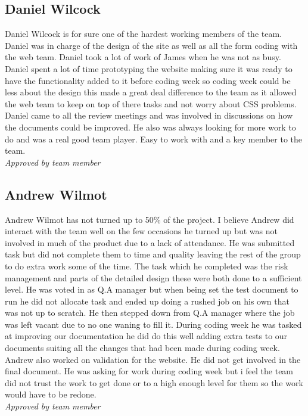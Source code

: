 \subsection{Daniel Wilcock}
    Daniel Wilcock is for sure one of the hardest working members of the team. Daniel was in charge of the design of the site as well as all the form coding with the web team. Daniel took a lot of work of James when he was not as busy. Daniel spent a lot of time prototyping the website making sure it was ready to have the functionality added to it before coding week so coding week could be less about the design this made a great deal difference to the team as it allowed the web team to keep on top of there tasks and not worry about CSS problems.
    Daniel came to all the review meetings and was involved in discussions on how the documents could be improved. He also was always looking for more work to do and was a real good team player. Easy to work with and a key member to the team.\\
    \emph{Approved by team member}

\subsection{Andrew Wilmot}
    Andrew Wilmot has not turned up to 50\% of the project. I believe Andrew did interact with the team well on the few occasions he turned up but was not involved in much of the product due to a lack of attendance. He was submitted task but did not complete them to time and quality leaving the rest of the group to do extra work some of the time. The task which he completed was the risk management and parts of the detailed design these were both done to a sufficient level.  He was voted in as Q.A manager but when being set the test document to run he did not allocate task and ended up doing a rushed job on his own that was not up to scratch. He then stepped down from Q.A manager where the job was left vacant due to no one waning to fill it. During coding week he was tasked at improving our documentation he did do this well adding extra tests to our documents suiting all the changes that had been made during coding week. Andrew also worked on validation for the website. He did not get involved in the final document. He was asking for work during coding week but i feel the team did not trust the work to get done or to a high enough level for them so the work would have to be redone.\\
    \emph{Approved by team member}
    
